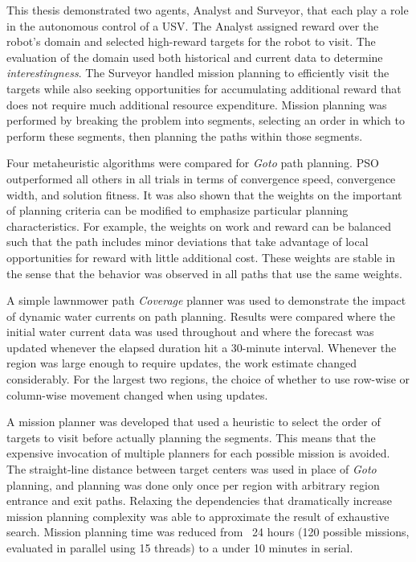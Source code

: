 \documentclass{tamuccthesis}
\begin{document}
This thesis demonstrated two agents, Analyst and Surveyor, that each play a role in the autonomous control of a USV. The Analyst assigned reward over the robot's domain and selected high-reward targets for the robot to visit. The evaluation of the domain used both historical and current data to determine \textit{interestingness}. The Surveyor handled mission planning to efficiently visit the targets while also seeking opportunities for accumulating additional reward that does not require much additional resource expenditure. Mission planning was performed by breaking the problem into segments, selecting an order in which to perform these segments, then planning the paths within those segments. 

Four metaheuristic algorithms were compared for \textit{Goto} path planning. PSO outperformed all others in all trials in terms of convergence speed, convergence width, and solution fitness. It was also shown that the weights on the important of planning criteria can be modified to emphasize particular planning characteristics. For example, the weights on work and reward can be balanced such that the path includes minor deviations that take advantage of local opportunities for reward with little additional cost. These weights are stable in the sense that the behavior was observed in all paths that use the same weights. 

A simple lawnmower path \textit{Coverage} planner was used to demonstrate the impact of dynamic water currents on path planning. Results were compared where the initial water current data was used throughout and where the forecast was updated whenever the elapsed duration hit a 30-minute interval. Whenever the region was large enough to require updates, the work estimate changed considerably. For the largest two regions, the choice of whether to use row-wise or column-wise movement changed when using updates. 

A mission planner was developed that used a heuristic to select the order of targets to visit before actually planning the segments. This means that the expensive invocation of multiple planners for each possible mission is avoided. The straight-line distance between target centers was used in place of \textit{Goto} planning, and  planning was done only once per region with arbitrary region entrance and exit paths. Relaxing the dependencies that dramatically increase mission planning complexity was able to approximate the result of exhaustive search. Mission planning time was reduced from ~24 hours (120 possible missions, evaluated in parallel using 15 threads) to a under 10 minutes in serial. 
\end{document}
